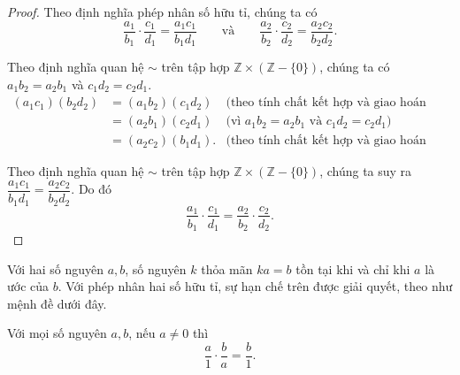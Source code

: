 \begin{proof}
    Theo định nghĩa phép nhân số hữu tỉ, chúng ta có
    \[
        \frac{a_{1}}{b_{1}}\cdot\frac{c_{1}}{d_{1}} = \frac{a_{1}c_{1}}{b_{1}d_{1}}\qquad\text{và}\qquad\frac{a_{2}}{b_{2}}\cdot\frac{c_{2}}{d_{2}} = \frac{a_{2}c_{2}}{b_{2}d_{2}}.
    \]

    Theo định nghĩa quan hệ $\sim$ trên tập hợp $\mathbb{Z}\times(\mathbb{Z} - \{0\})$, chúng ta có $a_{1}b_{2} = a_{2}b_{1}$ và $c_{1}d_{2} = c_{2}d_{1}$.
    \begin{align*}
        (a_{1}c_{1})(b_{2}d_{2}) & = (a_{1}b_{2})(c_{1}d_{2})  & \text{(theo tính chất kết hợp và giao hoán của phép nhân số nguyên)} \\
                                 & = (a_{2}b_{1})(c_{2}d_{1})  & \text{(vì $a_{1}b_{2} = a_{2}b_{1}$ và $c_{1}d_{2} = c_{2}d_{1}$)}   \\
                                 & = (a_{2}c_{2})(b_{1}d_{1}). & \text{(theo tính chất kết hợp và giao hoán của phép nhân số nguyên)}
    \end{align*}

    Theo định nghĩa quan hệ $\sim$ trên tập hợp $\mathbb{Z}\times(\mathbb{Z} - \{0\})$, chúng ta suy ra $\dfrac{a_{1}c_{1}}{b_{1}d_{1}} = \dfrac{a_{2}c_{2}}{b_{2}d_{2}}$. Do đó
    \[
        \frac{a_{1}}{b_{1}}\cdot\frac{c_{1}}{d_{1}} = \frac{a_{2}}{b_{2}}\cdot\frac{c_{2}}{d_{2}}.
    \]
\end{proof}

Với hai số nguyên $a, b$, số nguyên $k$ thỏa mãn $ka = b$ tồn tại khi và chỉ khi $a$ là ước của $b$. Với phép nhân hai số hữu tỉ, sự hạn chế trên được giải quyết, theo như mệnh đề dưới đây.
\begin{proposition}
    Với mọi số nguyên $a, b$, nếu $a\ne 0$ thì
    \[
        \frac{a}{1}\cdot\frac{b}{a} = \frac{b}{1}.
    \]
\end{proposition}

